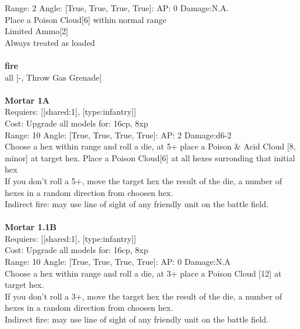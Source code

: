 Range: 2  Angle: [True, True, True, True]: AP: 0 Damage:N.A. \\
Place a Poison Cloud[6] within normal range\\ 
Limited Ammo[2]\\ 
Always treated as loaded\\ 







\ \\ {\bf fire } \\
all [-, Throw Gas Grenade] \\

\ \\
{\bf Mortar 1A } \\

Requiers: [[shared:1], [type:infantry]] \\
Cost: Upgrade all models for: 16cp, 8xp \\


Range: 10  Angle: [True, True, True, True]: AP: 2 Damage:d6-2 \\
Choose a hex within range and roll a die, at 5+ place a Poison \& Acid Cloud [8, minor] at target hex. Place a Poison Cloud[6]  at all hexes surronding that initial hex\\ 
If you don't roll a 5+, move the target hex the result of the die, a number of hexes in a random direction from choosen hex.\\ 
Indirect fire: may use line of sight of any friendly unit on the battle field.\\ 








\ \\
{\bf Mortar 1.1B } \\

Requiers: [[shared:1], [type:infantry]] \\
Cost: Upgrade all models for: 16cp, 8xp \\


Range: 10  Angle: [True, True, True, True]: AP: 0 Damage:N.A \\
Choose a hex within range and roll a die, at 3+ place a Poison Cloud [12] at target hex.\\ 
If you don't roll a 3+, move the target hex the result of the die, a number of hexes in a random direction from choosen hex.\\ 
Indirect fire: may use line of sight of any friendly unit on the battle field.\\ 








